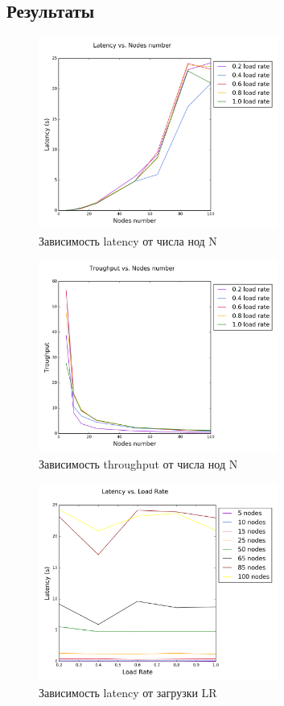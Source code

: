 \documentclass[12pt]{article}
\begin{document}
\subsection{Результаты}
\begin{figure}[H]
\centering
\includegraphics[width=0.7\textwidth]{Plots/LNN.png}
\caption{Зависимость latency от числа нод N}
\end{figure}

\begin{figure}[H]
\centering
\includegraphics[width=0.7\textwidth]{Plots/TNN.png}
\caption{Зависимость throughput от числа нод N}
\end{figure}

\begin{figure}[H]
\centering
\includegraphics[width=0.7\textwidth]{Plots/LLR.png}
\caption{Зависимость latency от загрузки LR}
\end{figure}
\end{document}
